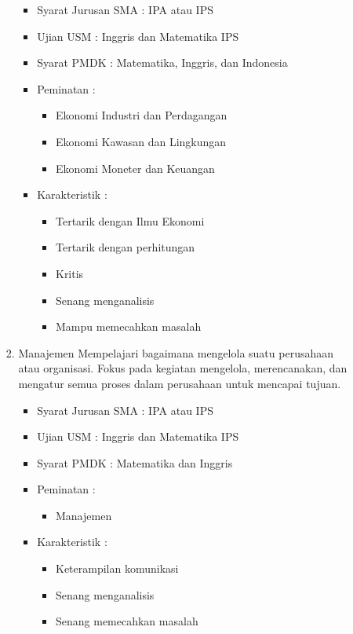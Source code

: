 \documentclass[a4paper,twoside]{article}
\begin{document}
\begin{enumerate}
\begin{enumerate}
\begin{enumerate}
					\begin{itemize}
						\item Syarat Jurusan SMA : IPA atau IPS
						\item Ujian USM : Inggris dan Matematika IPS
						\item Syarat PMDK : Matematika, Inggris, dan Indonesia
						\item Peminatan :
						\begin{itemize}
							\item Ekonomi Industri dan Perdagangan
							\item Ekonomi Kawasan dan Lingkungan
							\item Ekonomi Moneter dan Keuangan
						\end{itemize}
						\item Karakteristik :
						\begin{itemize}
							\item Tertarik dengan Ilmu Ekonomi
							\item Tertarik dengan perhitungan
							\item Kritis
							\item Senang menganalisis
							\item Mampu memecahkan masalah
						\end{itemize}
					\end{itemize}
					
				\item Manajemen
					Mempelajari bagaimana mengelola suatu perusahaan atau organisasi. Fokus pada kegiatan mengelola, merencanakan, dan mengatur semua proses dalam perusahaan untuk mencapai tujuan.
					\begin{itemize}
						\item Syarat Jurusan SMA : IPA atau IPS
						\item Ujian USM : Inggris dan Matematika IPS
						\item Syarat PMDK : Matematika dan Inggris
						\item Peminatan :
						\begin{itemize}
							\item Manajemen
						\end{itemize}
						\item Karakteristik :
						\begin{itemize}
							\item Keterampilan komunikasi
							\item Senang menganalisis
							\item Senang memecahkan masalah
						\end{itemize}
					\end{itemize}									
				

\end{enumerate}
\end{enumerate}
\end{enumerate}
\end{document}
